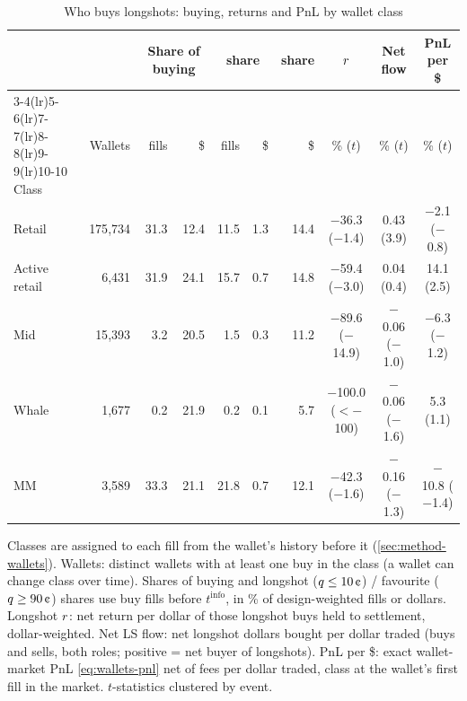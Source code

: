 \begin{table}[t]
\centering
\small
\begin{threeparttable}
\caption{Who buys longshots: buying, returns and PnL by wallet class}\label{tab:wallets-class}
\footnotesize
\setlength{\tabcolsep}{4pt}
\begin{tabular}{lrrrrrrccc}
\toprule
& & \multicolumn{2}{c}{Share of buying} & \multicolumn{2}{c}{\LS{} share} & \FAV{} share & \LS{} $r$ & Net \LS{} flow & PnL per \$ \\
\cmidrule(lr){3-4}\cmidrule(lr){5-6}\cmidrule(lr){7-7}\cmidrule(lr){8-8}\cmidrule(lr){9-9}\cmidrule(lr){10-10}
Class & Wallets & fills & \$ & fills & \$ & \$ & \% ($t$) & \% ($t$) & \% ($t$) \\
\midrule
Retail & 175{,}734 & 31.3 & 12.4 & 11.5 & 1.3 & 14.4 & $-$36.3 ($-$1.4) & 0.43 (3.9) & $-$2.1 ($-$0.8) \\
Active retail & 6{,}431 & 31.9 & 24.1 & 15.7 & 0.7 & 14.8 & $-$59.4 ($-$3.0) & 0.04 (0.4) & 14.1 (2.5) \\
Mid & 15{,}393 & 3.2 & 20.5 & 1.5 & 0.3 & 11.2 & $-$89.6 ($-$14.9) & $-$0.06 ($-$1.0) & $-$6.3 ($-$1.2) \\
Whale & 1{,}677 & 0.2 & 21.9 & 0.2 & 0.1 & 5.7 & $-$100.0 ($<-$100) & $-$0.06 ($-$1.6) & 5.3 (1.1) \\
MM & 3{,}589 & 33.3 & 21.1 & 21.8 & 0.7 & 12.1 & $-$42.3 ($-$1.6) & $-$0.16 ($-$1.3) & $-$10.8 ($-$1.4) \\
\bottomrule
\end{tabular}
\begin{tablenotes}\footnotesize
\item Classes are assigned to each fill from the wallet's history before it (\cref{sec:method-wallets}).
  Wallets: distinct wallets with at least one buy in the class (a wallet can change class over time).
  Shares of buying and longshot ($\q\le10\cents$) / favourite ($\q\ge90\cents$) shares use buy fills before
  $t^{\mathrm{info}}$, in \% of design-weighted fills or dollars. Longshot $r$: net return per dollar of
  those longshot buys held to settlement, dollar-weighted. Net LS flow: net longshot dollars bought per
  dollar traded (buys and sells, both roles; positive = net buyer of longshots). PnL per \$: exact
  wallet-market PnL \eqref{eq:wallets-pnl} net of fees per dollar traded, class at the wallet's first fill
  in the market. $t$-statistics clustered by event.
\end{tablenotes}
\end{threeparttable}
\end{table}

